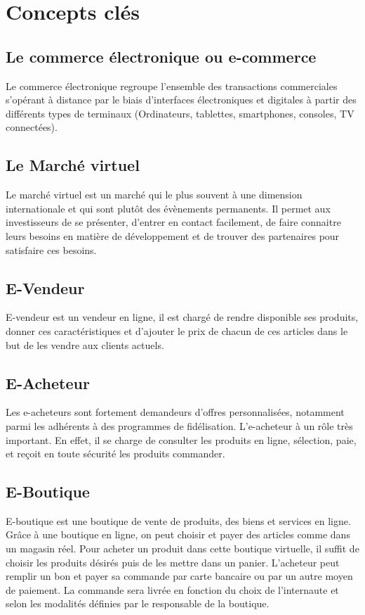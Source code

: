 \section{Concepts clés}
\subsection{Le commerce électronique ou e-commerce}
Le commerce électronique regroupe l’ensemble des transactions commerciales s’opérant à distance par le biais d’interfaces électroniques et digitales à partir des différents types de terminaux (Ordinateurs, tablettes, smartphones, consoles, TV connectées).

\subsection{Le Marché virtuel}
Le marché virtuel est un marché qui le plus souvent à une dimension internationale et qui sont plutôt des évènements permanents. Il permet aux investisseurs de se présenter, d’entrer en contact facilement, de faire connaitre leurs besoins en matière de développement et de trouver des partenaires pour satisfaire ces besoins.

\subsection{E-Vendeur}
E-vendeur est un vendeur en ligne, il est chargé de rendre disponible ses produits, donner ces caractéristiques et d'ajouter le prix de chacun de ces articles dans le but de les vendre aux clients actuels.

\subsection{E-Acheteur}
Les e-acheteurs sont fortement demandeurs d’offres personnalisées, notamment parmi les adhérents à des programmes de fidélisation. L'e-acheteur à un rôle très important. En effet, il se charge de consulter les produits en ligne, sélection, paie, et reçoit en toute sécurité les produits commander.

\subsection{E-Boutique}
E-boutique est une boutique de vente de produits, des biens et services en ligne. Grâce à une boutique en ligne, on peut choisir et payer des articles comme dans un magasin réel. Pour acheter un produit dans cette boutique virtuelle, il suffit de choisir les produits désirés puis de les mettre dans un panier. L’acheteur peut remplir un bon et payer sa commande par carte bancaire ou par un autre moyen de paiement. La commande sera livrée en fonction du choix de l’internaute et selon les modalités définies par le responsable de la boutique.


